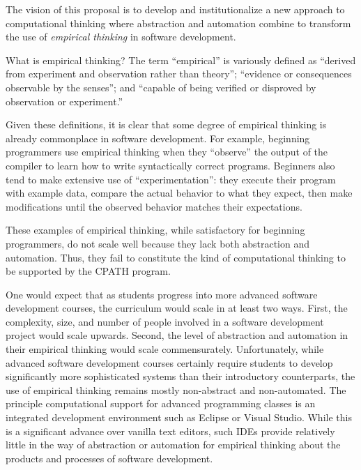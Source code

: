 The vision of this proposal is to develop and institutionalize a new
approach to computational thinking where abstraction and automation combine
to transform the use of {\em empirical thinking} in software development.

What is empirical thinking?  The term ``empirical'' is variously defined as
``derived from experiment and observation rather than theory''; ``evidence
or consequences observable by the senses''; and ``capable of being verified
or disproved by observation or experiment.''

Given these definitions, it is clear that some degree of empirical thinking
is already commonplace in software development.  For example, beginning
programmers use empirical thinking when they ``observe'' the output of the
compiler to learn how to write syntactically correct programs.  Beginners
also tend to make extensive use of ``experimentation'': they execute their
program with example data, compare the actual behavior to what they expect,
then make modifications until the observed behavior matches their
expectations.

These examples of empirical thinking, while satisfactory for beginning
programmers, do not scale well because they lack both abstraction and
automation. Thus, they fail to constitute the kind of computational
thinking to be supported by the CPATH program.

One would expect that as students progress into more advanced software
development courses, the curriculum would scale in at least two
ways. First, the complexity, size, and number of people involved in a
software development project would scale upwards.  Second, the level of
abstraction and automation in their empirical thinking would scale
commensurately. Unfortunately, while advanced software development courses
certainly require students to develop significantly more sophisticated
systems than their introductory counterparts, the use of empirical thinking
remains mostly non-abstract and non-automated.  The principle computational
support for advanced programming classes is an integrated development
environment such as Eclipse or Visual Studio. While this is a significant
advance over vanilla text editors, such IDEs provide relatively little in
the way of abstraction or automation for empirical thinking about the
products and processes of software development.

